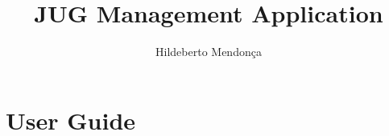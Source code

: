\documentclass[10pt,a4paper]{report}
\author{Hildeberto Mendon\c{c}a}
\title{JUG Management Application}
\begin{document}
\maketitle

\tableofcontents

\part{User Guide}






\end{document}
